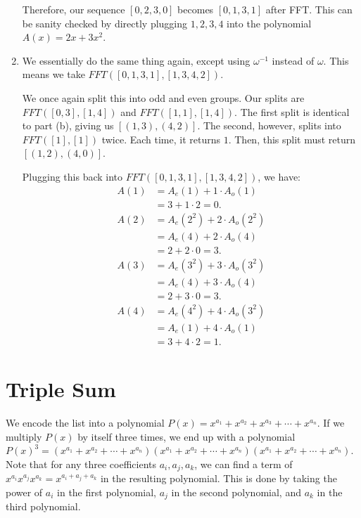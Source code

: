 \documentclass{article}
\begin{document}
\begin{enumerate}[label = \alph*)]
	Therefore, our sequence $[0, 2, 3, 0]$ becomes $[0, 1, 3, 1]$ after FFT. This can be sanity checked by directly plugging $1, 2, 3, 4$ into the polynomial $A(x) = 2x + 3x^2$.
	\item We essentially do the same thing again, except using $\omega^{-1}$ instead of $\omega$. This means we take $FFT([0, 1, 3, 1], [1, 3, 4, 2])$.
	
	We once again split this into odd and even groups. Our splits are $FFT([0, 3], [1, 4])$ and $FFT([1, 1], [1, 4])$. The first split is identical to part (b), giving us $[(1, 3), (4, 2)]$. The second, however, splits into $FFT([1], [1])$ twice. Each time, it returns $1$. Then, this split must return $ [(1, 2), (4, 0)] $.
	
	Plugging this back into $FFT([0, 1, 3, 1], [1, 3, 4, 2])$, we have:
	\begin{align*}
		A(1) &= A_e(1) + 1 \cdot A_o(1) \\
		&= 3 + 1 \cdot 2 = \boxed{0}. \\
		A(2) &= A_e(2^2) + 2 \cdot A_o(2^2) \\
		&= A_e(4) + 2 \cdot A_o(4) \\
		&= 2 + 2 \cdot 0 = \boxed{3}. \\
		A(3) &= A_e(3^2) + 3 \cdot A_o(3^2) \\
		&= A_e(4) + 3 \cdot A_o(4) \\
		&= 2 + 3 \cdot 0 = \boxed{3}. \\
		A(4) &= A_e(4^2) + 4 \cdot A_o(3^2) \\
		&= A_e(1) + 4 \cdot A_o(1) \\
		&= 3 + 4 \cdot 2 = \boxed{1}.
	\end{align*}
\end{enumerate}

\newpage
\section{Triple Sum}
We encode the list into a polynomial $ P(x) = x^{a_1} + x^{a_2} + x^{a_3} + \cdots + x^{a_n} $. If we multiply $P(x)$ by itself three times, we end up with a polynomial $ P(x)^3 = (x^{a_1} + x^{a_2} + \cdots + x^{a_n})(x^{a_1} + x^{a_2} + \cdots + x^{a_n})(x^{a_1} + x^{a_2} + \cdots + x^{a_n}) $. Note that for any three coefficients $a_i, a_j, a_k$, we can find a term of $x^{a_i}x^{a_j}x^{a_k} = x^{a_i + a_j + a_k}$ in the resulting polynomial. This is done by taking the power of $a_i$ in the first polynomial, $a_j$ in the second polynomial, and $a_k$ in the third polynomial.
\end{document}
